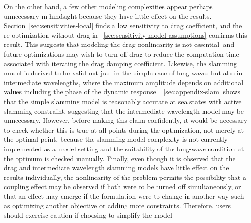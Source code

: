On the other hand, a few other modeling complexities appear perhaps unnecessary in hindsight because they have little effect on the results.
Section~\ref{sec:sensitivities-local} finds a low sensitivity to drag coefficient, and the re-optimization without drag in \sectionautorefname~\ref{sec:sensitivity-model-assumptions} confirms this result.%
This suggests that modeling the drag nonlinearity is not essential, and future optimizations may wish to turn off drag to reduce the computation time associated with iterating the drag damping coefficient.
Likewise, the slamming model is derived to be valid not just in the simple case of long waves but also in intermediate wavelengths, where the maximum amplitude depends on additional values including the phase of the dynamic response.
\appendixautorefname~\ref{sec:appendix-slam} shows that the simple slamming model is reasonably accurate at sea states with active slamming constraint, suggesting that the intermediate wavelength model may be unnecessary.
However, before making this claim confidently, it would be necessary to check whether this is true at all points during the optimization, not merely at the optimal point, because the slamming model complexity is not currently implemented as a model setting and the suitability of the long-wave condition at the optimum is checked manually. %
Finally, even though it is observed that the drag and intermediate wavelength slamming models have little effect on the results individually, the nonlinearity of the problem permits the possibility that a coupling effect may be observed if both were to be turned off simultaneously, or that an effect may emerge if the formulation were to change in another way such as optimizing another objective or adding more constraints.
Therefore, users should exercise caution if choosing to simplify the model.

